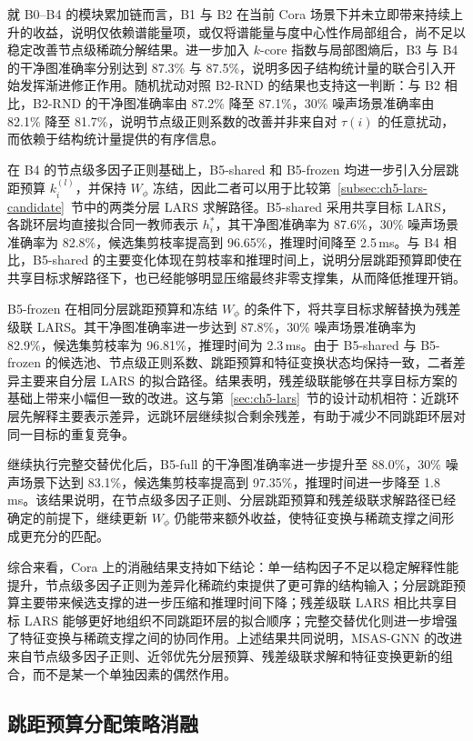就 B0--B4 的模块累加链而言，B1 与 B2 在当前 Cora 场景下并未立即带来持续上升的收益，说明仅依赖谱能量项，或仅将谱能量与度中心性作局部组合，尚不足以稳定改善节点级稀疏分解结果。进一步加入 $k$-core 指数与局部图熵后，B3 与 B4 的干净图准确率分别达到 87.3\% 与 87.5\%，说明多因子结构统计量的联合引入开始发挥渐进修正作用。随机扰动对照 B2-RND 的结果也支持这一判断：与 B2 相比，B2-RND 的干净图准确率由 87.2\% 降至 87.1\%，30\% 噪声场景准确率由 82.1\% 降至 81.7\%，说明节点级正则系数的改善并非来自对 $\tau(i)$ 的任意扰动，而依赖于结构统计量提供的有序信息。

在 B4 的节点级多因子正则基础上，B5-shared 和 B5-frozen 均进一步引入分层跳距预算 $k_i^{(l)}$，并保持 $W_\phi$ 冻结，因此二者可以用于比较第~\ref{subsec:ch5-lars-candidate}~节中的两类分层 LARS 求解路径。B5-shared 采用共享目标 LARS，各跳环层均直接拟合同一教师表示 $h_i^*$，其干净图准确率为 87.6\%，30\% 噪声场景准确率为 82.8\%，候选集剪枝率提高到 96.65\%，推理时间降至 2.5\,ms。与 B4 相比，B5-shared 的主要变化体现在剪枝率和推理时间上，说明分层跳距预算即使在共享目标求解路径下，也已经能够明显压缩最终非零支撑集，从而降低推理开销。

B5-frozen 在相同分层跳距预算和冻结 $W_\phi$ 的条件下，将共享目标求解替换为残差级联 LARS。其干净图准确率进一步达到 87.8\%，30\% 噪声场景准确率为 82.9\%，候选集剪枝率为 96.81\%，推理时间为 2.3\,ms。由于 B5-shared 与 B5-frozen 的候选池、节点级正则系数、跳距预算和特征变换状态均保持一致，二者差异主要来自分层 LARS 的拟合路径。结果表明，残差级联能够在共享目标方案的基础上带来小幅但一致的改进。这与第~\ref{sec:ch5-lars}~节的设计动机相符：近跳环层先解释主要表示差异，远跳环层继续拟合剩余残差，有助于减少不同跳距环层对同一目标的重复竞争。

继续执行完整交替优化后，B5-full 的干净图准确率进一步提升至 88.0\%，30\% 噪声场景下达到 83.1\%，候选集剪枝率提高到 97.35\%，推理时间进一步降至 1.8\,ms。该结果说明，在节点级多因子正则、分层跳距预算和残差级联求解路径已经确定的前提下，继续更新 $W_\phi$ 仍能带来额外收益，使特征变换与稀疏支撑之间形成更充分的匹配。

综合来看，Cora 上的消融结果支持如下结论：单一结构因子不足以稳定解释性能提升，节点级多因子正则为差异化稀疏约束提供了更可靠的结构输入；分层跳距预算主要带来候选支撑的进一步压缩和推理时间下降；残差级联 LARS 相比共享目标 LARS 能够更好地组织不同跳距环层的拟合顺序；完整交替优化则进一步增强了特征变换与稀疏支撑之间的协同作用。上述结果共同说明，MSAS-GNN 的改进来自节点级多因子正则、近邻优先分层预算、残差级联求解和特征变换更新的组合，而不是某一个单独因素的偶然作用。

\subsection{跳距预算分配策略消融}
\label{subsec:ch6-hopbudget}

